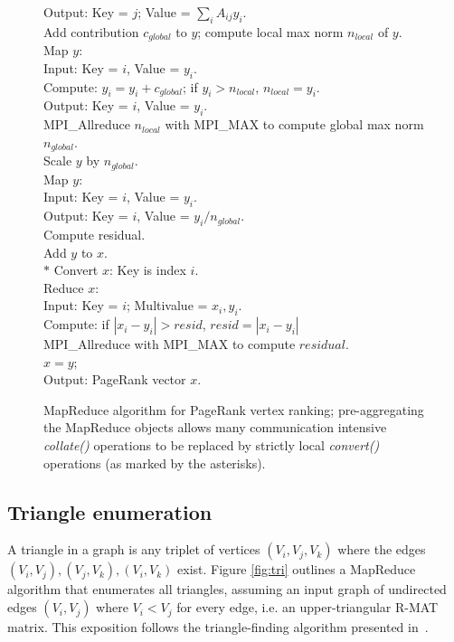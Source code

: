 \begin{figure}[htb]
\begin{center}
{\begin{minipage}{\textwidth}
\begin{tabbing}
\> \> \> Output:  Key = $j$; Value = $\sum_i A_{ij} y_i$. \\
\> Add contribution $c_{global}$ to $y$; compute local max norm $n_{local}$ of $y$. \\
\> \> Map $y$:  \\
\> \> \> Input:  Key = $i$, Value = $y_i$. \\
\> \> \> Compute: $y_i = y_i + c_{global}$; if $y_i > {n_{local}}$, $n_{local} = y_i$. \\
\> \> \> Output:  Key = $i$, Value = $y_i$. \\
\> \> MPI\_Allreduce $n_{local}$ with MPI\_MAX to compute global max norm $n_{global}$. \\
\> Scale $y$ by $n_{global}$. \\
\> \> Map $y$: \\
\> \> \> Input:  Key = $i$, Value = $y_i$. \\
\> \> \> Output:  Key = $i$, Value = $y_i / {n_{global}}$. \\
\> Compute residual. \\
\> \> Add $y$ to $x$. \\
$*$\> \> Convert $x$:  Key is index $i$. \\
\> \> Reduce $x$:   \\
\> \> \> Input:  Key = $i$; Multivalue = $x_i, y_i$. \\
\> \> \> Compute:  if $|x_i - y_i| > {resid}$, ${resid} = |x_i - y_i|$ \\
\> \> MPI\_Allreduce with MPI\_MAX to compute $residual$. \\
\> $x = y$; \\
Output:  PageRank vector $x$.
  \end{tabbing}
 \end{minipage}}\end{center}

 \caption{MapReduce algorithm for PageRank vertex ranking; pre-aggregating the MapReduce objects allows many communication intensive {\it collate()} 
operations to be replaced by strictly local {\it convert()} operations (as marked by the asterisks).}

 \label{fig:pr2}
\end{figure}


\subsection{Triangle enumeration}

A triangle in a graph is any triplet of vertices $(V_i,V_j,V_k)$ where
the edges $(V_i,V_j), (V_j,V_k), (V_i,V_k)$ exist.  Figure
\ref{fig:tri} outlines a MapReduce algorithm that enumerates all
triangles, assuming an input graph of undirected edges $(V_i,V_j)$
where $V_i < V_j$ for every edge, i.e. an upper-triangular R-MAT
matrix.  This exposition follows the triangle-finding algorithm
presented in~\cite{Cohen09}.

